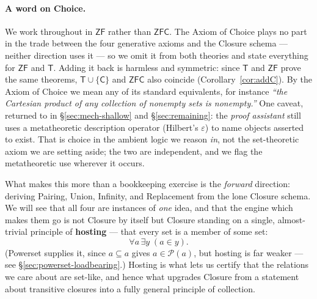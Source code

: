 \documentclass[11pt]{article}
\theoremstyle{plain}
\theoremstyle{definition}
\newcommand{\Pow}{\mathcal{P}}
\newcommand{\ZF}{\mathsf{ZF}}
\renewcommand{\ZF}{\textsf{ZF}}
\newcommand{\ZFC}{\textsf{ZFC}}
\newcommand{\T}{\textsf{T}}
\begin{document}
\paragraph{A word on Choice.} We work throughout in $\ZF$ rather than $\ZFC$. The
Axiom of Choice plays no part in the trade between the four generative axioms and
the Closure schema --- neither direction uses it --- so we omit it from both
theories and state everything for $\ZF$ and $\T$. Adding it back is harmless and
symmetric: since $\T$ and $\ZF$ prove the same theorems, $\T\cup\{\mathsf C\}$ and
$\ZFC$ also coincide (Corollary~\ref{cor:addC}). By the Axiom of Choice we mean any
of its standard equivalents, for instance \emph{``the Cartesian product of any
collection of nonempty sets is nonempty.''} One caveat, returned to in
\S\ref{sec:mech-shallow} and \S\ref{sec:remaining}: the \emph{proof assistant}
still uses a metatheoretic description operator (Hilbert's $\varepsilon$) to name
objects asserted to exist. That is choice in the ambient logic we reason
\emph{in}, not the set-theoretic axiom we are setting aside; the two are
independent, and we flag the metatheoretic use wherever it occurs.

What makes this more than a bookkeeping exercise is the \emph{forward} direction:
deriving Pairing, Union, Infinity, and Replacement from the lone Closure schema.
We will see that all four are instances of \emph{one} idea, and that the engine
which makes them go is not Closure by itself but Closure standing on a single,
almost-trivial principle of \textbf{hosting} --- that every set is a member of some
set:
\[
  \forall a\,\exists y\;(a \in y).
\]
(Powerset supplies it, since $a \subseteq a$ gives $a \in \Pow(a)$, but hosting is
far weaker --- see \S\ref{sec:powerset-loadbearing}.) Hosting is what lets us certify
that the relations we care about are set-like, and hence what upgrades Closure from a
statement about transitive closures into a fully general principle of collection.
\end{document}
